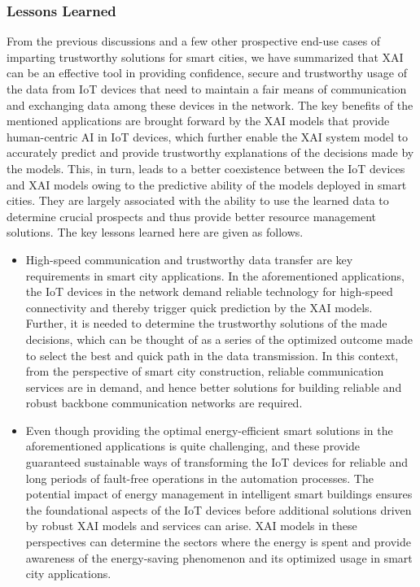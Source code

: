 \documentclass[journal]{IEEEtran}
\begin{document}
\subsubsection{Lessons Learned}
From the previous discussions and a few other prospective end-use cases of imparting trustworthy solutions for smart cities, we have summarized that XAI can be an effective tool in providing confidence, secure and trustworthy usage of the data from IoT devices that need to maintain a fair means of communication and exchanging data among these devices in the network. The key benefits of the mentioned applications are brought forward by the XAI models that provide human-centric AI in IoT devices, which further enable the XAI system model to accurately predict and provide trustworthy explanations of the decisions made by the models. This, in turn, leads to a better coexistence between the IoT devices and XAI models owing to the predictive ability of the models deployed in smart cities. They are largely associated with the ability to use the learned data to determine crucial prospects and thus provide better resource management solutions. The key lessons learned here are given as follows.

\begin{itemize}

    \item High-speed communication and trustworthy data transfer are key requirements in smart city applications. In the aforementioned applications, the IoT devices in the network demand reliable technology for high-speed connectivity and thereby trigger quick prediction by the XAI models. Further, it is needed to determine the trustworthy solutions of the made decisions, which can be thought of as a series of the optimized outcome made to select the best and quick path in the data transmission. In this context, from the perspective of smart city construction, reliable communication services are in demand, and hence better solutions for building reliable and robust backbone communication networks are required. 

    \item Even though providing the optimal energy-efficient smart solutions in the aforementioned applications is quite challenging, and these provide guaranteed sustainable ways of transforming the IoT devices for reliable and long periods of fault-free operations in the automation processes. The potential impact of energy management in intelligent smart buildings ensures the foundational aspects of the IoT devices before additional solutions driven by robust XAI models and services can arise. XAI models in these perspectives can determine the sectors where the energy is spent and provide awareness of the energy-saving phenomenon and its optimized usage in smart city applications.
    
\end{itemize}
\end{document}

